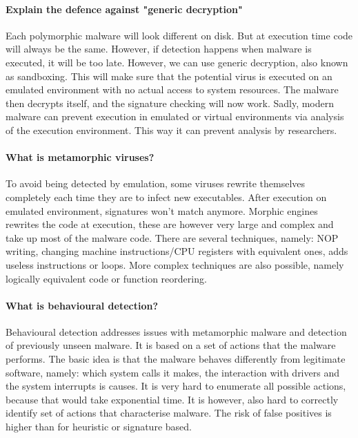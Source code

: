 \paragraph{Explain the defence against "generic decryption"}
Each polymorphic malware will look different on disk. But at execution time code will always be the same. However, if detection happens when malware is executed, it will be too late. However, we can use generic decryption, also known as sandboxing. This will make sure that the potential virus is executed on an emulated environment with no actual access to system resources. The malware then decrypts itself, and the signature checking will now work. Sadly, modern malware can prevent execution in emulated or virtual environments via analysis of the execution environment. This way it can prevent analysis by researchers.

\paragraph{What is metamorphic viruses?}
To avoid being detected by emulation, some viruses rewrite themselves completely each time they are to infect new executables. After execution on emulated environment, signatures won't match anymore. Morphic engines rewrites the code at execution, these are however very large and complex and take up most of the malware code. There are several techniques, namely: NOP writing, changing machine instructions/CPU registers with equivalent ones, adds useless instructions or loops. More complex techniques are also possible, namely logically equivalent code or function reordering.

\paragraph{What is behavioural detection?}
Behavioural detection addresses issues with metamorphic malware and detection of previously unseen malware. It is based on a set of actions that the malware performs. The basic idea is that the malware behaves differently from legitimate software, namely: which system calls it makes, the interaction with drivers and the system interrupts is causes. It is very hard to enumerate all possible actions, because that would take exponential time. It is however, also hard to correctly identify set of actions that characterise malware. The risk of false positives is higher than for heuristic or signature based.

